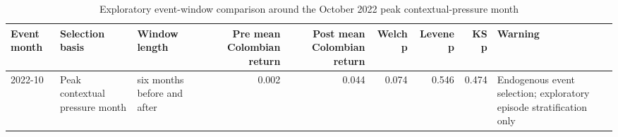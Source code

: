 \begin{table}
\caption{Exploratory event-window comparison around the October 2022 peak contextual-pressure month}
\label{tab:mean_shifts}
\begin{tabular}{lllrrrrrl}
\toprule
Event month & Selection basis & Window length & Pre mean Colombian return & Post mean Colombian return & Welch p & Levene p & KS p & Warning \\
\midrule
2022-10 & Peak contextual pressure month & six months before and after & 0.002 & 0.044 & 0.074 & 0.546 & 0.474 & Endogenous event selection; exploratory episode stratification only \\
\bottomrule
\end{tabular}
\end{table}
